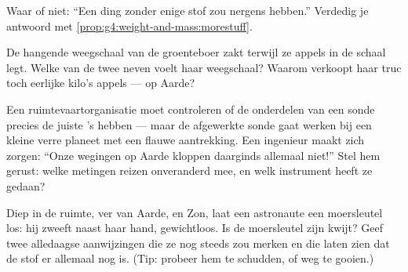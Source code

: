 \begin{exercise}[$\star$]\label{exo:g4:weight-and-mass:8}
Waar of niet: ``Een ding zonder enige stof zou nergens 
hebben.'' Verdedig je antwoord met
\cref{prop:g4:weight-and-mass:morestuff}.
\end{exercise}

\begin{exercise}[$\star$]\label{exo:g4:weight-and-mass:9}
De hangende weegschaal van de groenteboer zakt terwijl ze appels in de
schaal legt. Welke van de twee neven voelt haar weegschaal? Waarom
verkoopt haar truc toch eerlijke kilo's appels --- op Aarde?
\end{exercise}

\begin{exercise}[$\star\star$]\label{exo:g4:weight-and-mass:10}
Een ruimtevaartorganisatie moet controleren of de onderdelen van een
sonde precies de juiste 's hebben --- maar de afgewerkte sonde
gaat werken bij een kleine verre planeet met een flauwe aantrekking.
Een ingenieur maakt zich zorgen: ``Onze wegingen op Aarde kloppen
daarginds allemaal niet!'' Stel hem gerust: welke metingen reizen
onveranderd mee, en welk instrument heeft ze gedaan?
\end{exercise}

\begin{exercise}[$\star\star$]\label{exo:g4:weight-and-mass:11}
Diep in de ruimte, ver van Aarde,  en Zon, laat een astronaute
een moersleutel los: hij zweeft naast haar hand, gewichtloos. Is de
moersleutel zijn  kwijt? Geef twee alledaagse aanwijzingen die ze
nog steeds zou merken en die laten zien dat de stof er allemaal nog is.
(Tip: probeer hem te schudden, of weg te gooien.)
\end{exercise}
